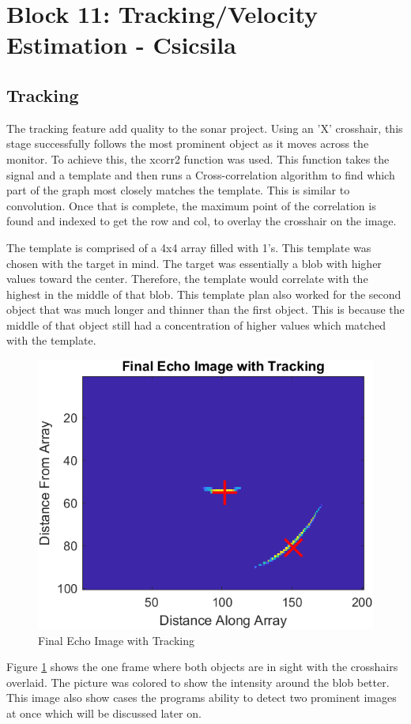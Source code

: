 
\section{Block 11: Tracking/Velocity Estimation - Csicsila}

\subsection{Tracking}
The tracking feature add quality to the sonar project. Using an 'X' crosshair, this stage successfully follows the most prominent object as it moves across the monitor. To achieve this, the xcorr2 function was used. This function takes the signal and a template and then runs a Cross-correlation algorithm to find which part of the graph most closely matches the template. This is similar to convolution. Once that is complete, the maximum point of the correlation is found and indexed to get the row and col, to overlay the crosshair on the image. 

The template is comprised of a 4x4 array filled with 1's. This template was chosen with the target in mind. The target was essentially a blob with higher values toward the center. Therefore, the template would correlate with the highest in the middle of that blob. This template plan also worked for the second object that was much longer and thinner than the first object. This is because the middle of that object still had a concentration of higher values which matched with the template.

\begin{figure}[H]
    \centering
    \includegraphics[width=0.5\linewidth]{figures/TrackingImage2.png}
    \caption{Final Echo Image with Tracking}
    \label{fig:TrackingImage2}
\end{figure}

Figure \ref{fig:TrackingImage2} shows the one frame where both objects are in sight with the crosshairs overlaid. The picture was colored to show the intensity around the blob better. This image also show cases the programs ability to detect two prominent images at once which will be discussed later on. 

